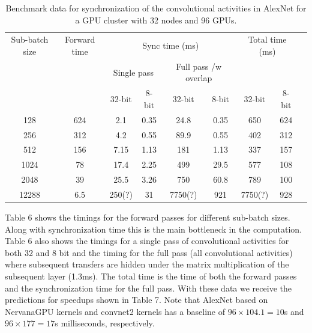 \documentclass{article} %
\begin{document}
\begin{table}[h]
	\caption{Benchmark data for synchronization of the convolutional activities in AlexNet for a GPU cluster with 32 nodes and 96 GPUs. }
	\label{sample-table}
	\begin{minipage}
		{\linewidth}
		\centering
		\begin{tabular}{ ccccccccc}
			\toprule[1.5pt]
			Sub-batch size &  Forward time & \multicolumn{4}{c}{Sync time (ms)}   & \multicolumn{2}{c}{Total time (ms) }    \\
			 & &  \multicolumn{2}{c}{Single pass} & \multicolumn{2}{c}{Full pass /w overlap} &  &\\
			 &  & 32-bit & 8-bit &  32-bit & 8-bit & 32-bit & 8-bit \\
			\midrule	
			  128 & 624  & 2.1 & 0.35 &  24.8 & 0.35 & 650 & 624 \\		
			 256 & 312   & 4.2 & 0.55 & 89.9 & 0.55 & 402 & 312\\	
		  512  & 156  &  7.15 & 1.13 & 181 & 1.13 & 337 & 157 \\		
			 1024 & 78   & 17.4 & 2.25 & 499 & 29.5 & 577 & 108 \\		
			 2048 & 39   & 25.5 & 3.26 & 750 & 60.8  & 789 & 100 \\		
			 12288 & 6.5   & 250(?) & 31 & 7750(?) & 921  & 7750(?) & 928 \\				
			\bottomrule[1.25pt]
		\end{tabular}
		\par
		\bigskip
	\end{minipage}
\end{table}


Table 6 shows the timings for the forward passes for different sub-batch sizes. Along with synchronization time this is the main bottleneck in the computation. Table 6 also shows the timings for a single pass of convolutional activities for both 32 and 8 bit and the timing for the full pass (all convolutional activities) where subsequent transfers are hidden under the matrix multiplication of the subsequent layer (1.3ms). The total time is the time of both the forward passes and the synchronization time for the full pass. With these data we receive the predictions for speedups shown in Table 7. Note that AlexNet based on NervanaGPU kernels and convnet2 kernels has a baseline of $96\times 104.1 = 10$s and $96\times 177 = 17$s milliseconds, respectively.
\end{document}
